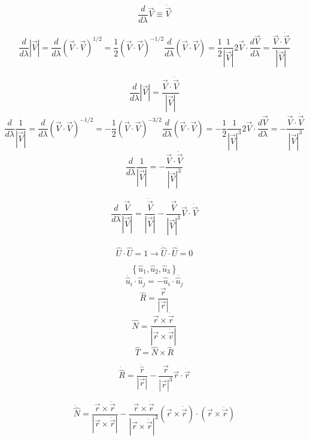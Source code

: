 \documentclass[10pt]{article}
\begin{document}
\[
  \frac{d}{d \lambda} \vec V \equiv \dot {\vec V}
\]

\[
    \frac{d}{d \lambda} | {\vec V} | 
  = \frac{d}{d\lambda} \left( \vec V \cdot \vec V \right)^{1/2}
  = \frac{1}{2} \left( \vec V \cdot \vec V \right)^{-1/2} \frac{d}{d \lambda} \left( \vec V \cdot \vec V \right) 
  = \frac{1}{2} \frac{1}{|\vec V|} 2 \vec V \cdot \frac{d \vec V}{d\lambda}
  = \frac{\vec V \cdot \dot{\vec V}}{|\vec V|}
\]

\[
  \frac{d}{d \lambda} |\vec V| = \frac{\vec V \cdot \dot {\vec V}}{|\vec V|}
\]
\[
     \frac{d}{d \lambda} \frac{1}{| {\vec V} |}
  =  \frac{d}{d\lambda} \left( \vec V \cdot \vec V \right)^{-1/2}
  = -\frac{1}{2} \left( \vec V \cdot \vec V \right)^{-3/2} \frac{d}{d \lambda} \left( \vec V \cdot \vec V \right) 
  = -\frac{1}{2} \frac{1}{|\vec V|^3} 2 \vec V \cdot \frac{d \vec V}{d\lambda}
  = -\frac{\vec V \cdot \dot{\vec V}}{|\vec V|^3}
\]
\[
     \frac{d}{d \lambda} \frac{1}{| {\vec V} |} 
  = -\frac{\vec V \cdot \dot{\vec V}}{|\vec V|^3}
\]

\[
  \frac{d}{d\lambda} \frac{\vec V}{|\vec V|} = \frac{\dot {\vec V}}{|\vec V|} - \frac{\vec V}{|\vec V|^3} \vec V \cdot \dot{\vec V}
\]

\[
   \hat U \cdot \hat U = 1 \rightarrow \dot {\hat U } \cdot \hat U = 0
\]

\[
  \left\{\hat u_1, \hat u_2, \hat u_3 \right\}
\]
\[
  \dot {\hat u_i} \cdot \hat u_j = - \hat u_i \cdot \dot {\hat u_j}
\]
\[
  \hat R = \frac{\vec r}{|\vec r|}
\]
\[
  \hat N = \frac{\vec r \times \dot {\vec r}}{|\vec r \times \dot {\vec v}|}
\]
\[
  \hat T = \hat N \times \hat R
\]

\[
  \dot {\hat R} = \frac{\dot {\hat r}}{|\vec r|} - \frac{\vec r}{|\vec r|^3} \vec r \cdot \dot {\vec r} 
\]

\[
  \dot {\hat N} = \frac{ \vec r \times \ddot {\vec r} }{|\vec r \times \dot {\vec r} |} - \frac{ \vec r \times \dot {\vec r}}{|\vec r \times \dot {\vec r}|^3}
                    (\vec r \times \dot {\vec r} ) \cdot (\vec r \times \ddot {\vec r} )
\]
\end{document}
